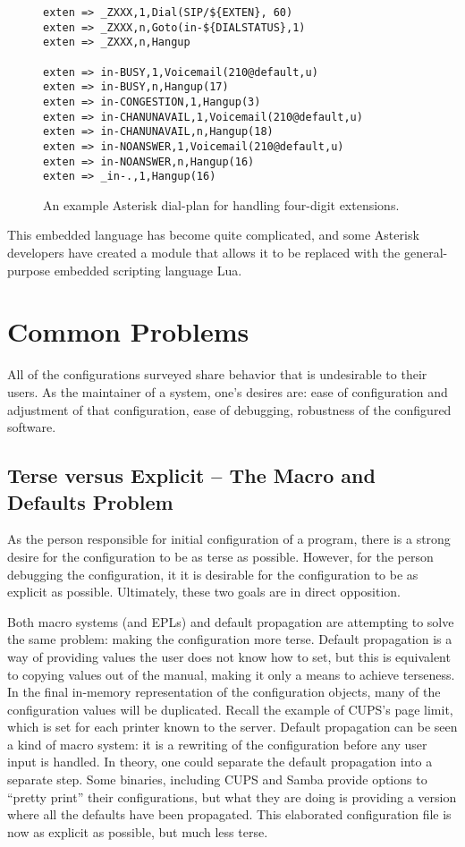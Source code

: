 \documentclass[letterpaper,twocolumn,10pt]{article}
\begin{document}
\begin{figure}
\caption{\label{fig:ast}An example Asterisk dial-plan for handling four-digit extensions.}
\scriptsize
\begin{verbatim}
exten => _ZXXX,1,Dial(SIP/${EXTEN}, 60)
exten => _ZXXX,n,Goto(in-${DIALSTATUS},1)
exten => _ZXXX,n,Hangup

exten => in-BUSY,1,Voicemail(210@default,u)
exten => in-BUSY,n,Hangup(17)
exten => in-CONGESTION,1,Hangup(3)
exten => in-CHANUNAVAIL,1,Voicemail(210@default,u)
exten => in-CHANUNAVAIL,n,Hangup(18)
exten => in-NOANSWER,1,Voicemail(210@default,u)
exten => in-NOANSWER,n,Hangup(16)
exten => _in-.,1,Hangup(16)
\end{verbatim}
\end{figure}

This embedded language has become quite complicated, and some Asterisk developers have created a module that allows it to be replaced with the general-purpose embedded scripting language Lua.

\section{Common Problems}
All of the configurations surveyed share behavior that is undesirable to their users. As the maintainer of a system, one's desires are: ease of configuration and adjustment of that configuration, ease of debugging, robustness of the configured software.

\subsection{Terse versus Explicit -- The Macro and Defaults Problem}
As the person responsible for initial configuration of a program, there is a strong desire for the configuration to be as terse as possible. However, for the person debugging the configuration, it it is desirable for the configuration to be as explicit as possible. Ultimately, these two goals are in direct opposition.

Both macro systems (and EPLs) and default propagation are attempting to solve the same problem: making the configuration more terse. Default propagation is a way of providing values the user does not know how to set, but this is equivalent to copying values out of the manual, making it only a means to achieve terseness. In the final in-memory representation of the configuration objects, many of the configuration values will be duplicated. Recall the example of CUPS's page limit, which is set for each printer known to the server. Default propagation can be seen a kind of macro system: it is a rewriting of the configuration before any user input is handled. In theory, one could separate the default propagation into a separate step. Some binaries, including CUPS and Samba provide options to ``pretty print'' their configurations, but what they are doing is providing a version where all the defaults have been propagated. This elaborated configuration file is now as explicit as possible, but much less terse.
\end{document}

